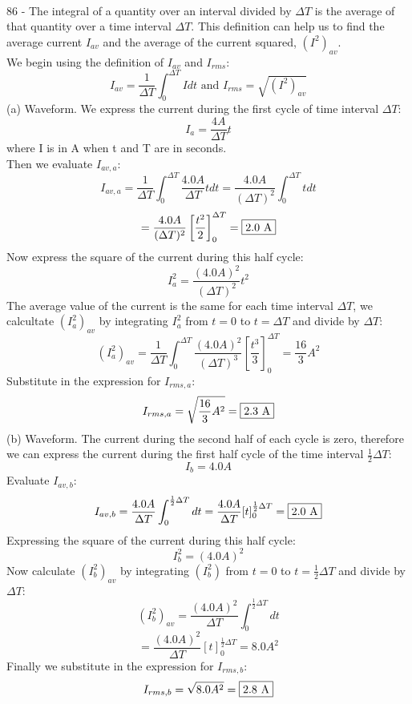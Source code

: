 \documentclass{report}
\begin{document}
\paragraph{}
86 - The integral of a quantity over an interval divided by $\Delta T$ is the average of that quantity over a time interval $\Delta T$. This definition can help us to find the average current $I_{av}$ and the average of the current squared, $(I^2)_{av}$.\\
We begin using the definition of $I_{av}$ and $I_{rms}$:
$$I_{av} = \frac{1}{\Delta T} \int_0^{\Delta T} Idt \text{ and } I_{rms} = \sqrt{(I^2)_{av}}$$
(a) Waveform. We express the current during the first cycle of time interval $\Delta T$:
$$I_a = \frac{4 A}{\Delta T}t$$
where I is in A when t and T are in seconds.\\
Then we evaluate $I_{av,a}$:
$$I_{av,a} = \frac{1}{\Delta T} \int_0^{\Delta T} \frac{4.0 A}{\Delta T}tdt = \frac{4.0 A}{(\Delta T)^2} \int_0^{\Delta T}tdt$$
$$= \frac{4.0 A}{(\Delta T)^2} \left[ \frac{t^2}{2} \right]_0^{\Delta T} = \fbox{2.0 A}$$
Now express the square of the current during this half cycle:
$$I_a^2 = \frac{(4.0 A)^2}{(\Delta T)^2}t^2$$
The average value of the current is the same for each time interval $\Delta T$, we calcultate $(I_a^2)_{av}$ by integrating $I_a^2$ from $t = 0$ to $t = \Delta T$ and divide by $\Delta T$:
$$(I_a^2)_{av} = \frac{1}{\Delta T} \int_0^{\Delta T} \frac{(4.0 A)^2}{(\Delta T)^3} \left[ \frac{t^3}{3} \right]_0^{\Delta T} = \frac{16}{3}A^2$$
Substitute in the expression for $I_{rms, a}$:
$$I_{rms, a} = \sqrt{\frac{16}{3}A^2} = \fbox{2.3 A}$$
(b) Waveform. The current during the second half of each cycle is zero, therefore we can express the current during the first half cycle of the time interval $\frac{1}{2}\Delta T$:
$$I_b = 4.0 A$$
Evaluate $I_{av,b}$:
$$I_{av,b} = \frac{4.0A}{\Delta T} \int_0^{\frac{1}{2}\Delta T}dt = \frac{4.0 A}{\Delta T}[t]_0^{\frac{1}{2}\Delta T} = \fbox{2.0 A}$$
Expressing the square of the current during this half cycle:
$$I_b^2 = (4.0 A)^2$$
Now calculate $(I_b^2)_{av}$ by integrating $(I_b^2)$ from $t = 0$ to $t = \frac{1}{2}\Delta T$ and divide by $\Delta T$:
$$(I_b^2)_{av} = \frac{(4.0 A)^2}{\Delta T} \int_0^{\frac{1}{2}\Delta T}dt$$
$$= \frac{(4.0 A)^2}{\Delta T} [t]_0^{\frac{1}{2}\Delta T} = 8.0 A^2$$
Finally we substitute in the expression for $I_{rms, b}$:
$$I_{rms, b} = \sqrt{8.0 A^2} = \fbox{2.8 A}$$
\end{document}
